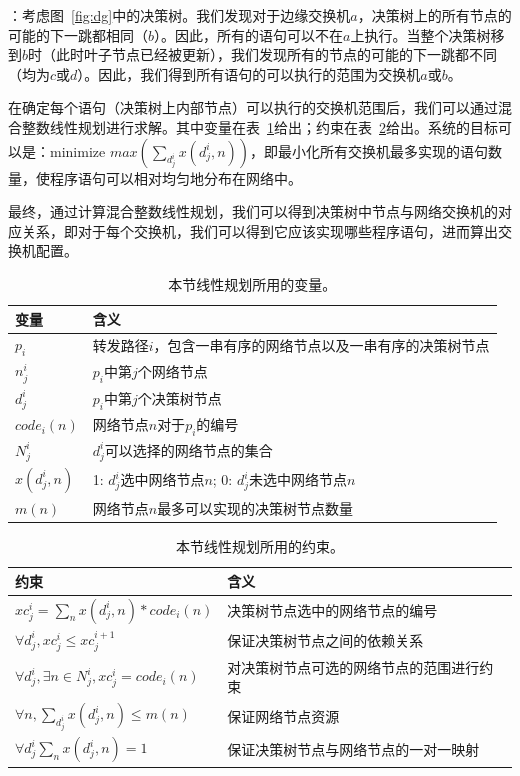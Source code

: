 ：考虑图~\ref{fig:dg}中的决策树。我们发现对于边缘交换机$a$，决策树上的所有节点的可能的下一跳都相同（$b$）。因此，所有的语句可以不在$a$上执行。当整个决策树移到$b$时（此时叶子节点已经被更新），我们发现所有的节点的可能的下一跳都不同（均为$c$或$d$）。因此，我们得到所有语句的可以执行的范围为交换机$a$或$b$。


在确定每个语句（决策树上内部节点）可以执行的交换机范围后，我们可以通过混合整数线性规划进行求解。其中变量在表~\ref{table:variables}给出；约束在表~\ref{table:constraints}给出。系统的目标可以是：minimize $max(\sum_{d_j^i} x(d_j^i, n))$，即最小化所有交换机最多实现的语句数量，使程序语句可以相对均匀地分布在网络中。

最终，通过计算混合整数线性规划，我们可以得到决策树中节点与网络交换机的对应关系，即对于每个交换机，我们可以得到它应该实现哪些程序语句，进而算出交换机配置。

\begin{table}[]
\centering
\begin{tabular}{l|l}
\hline
变量     & 含义                                                             \\ \hline
$p_i$ & 转发路径$i$，包含一串有序的网络节点以及一串有序的决策树节点                            \\ 
$n_j^i$          &  $p_i$中第$j$个网络节点                      \\
$d_j^i$        & $p_i$中第$j$个决策树节点                                            \\
$code_i(n)$        &  网络节点$n$对于$p_i$的编号\\
$N_j^i$     &  $d_j^i$可以选择的网络节点的集合\\
$x(d_j^i, n)$      &  1: $d_j^i$选中网络节点$n$; 0: $d_j^i$未选中网络节点$n$\\
$m(n)$              & 网络节点$n$最多可以实现的决策树节点数量\\
\hline              
\end{tabular}
\caption{\small 本节线性规划所用的变量。}
\label{table:variables}
\end{table}

\begin{table}[]
\centering
\begin{tabular}{l|l}
\hline
约束                                        & 含义                               \\ \hline
$xc_j^i = \sum_n x(d_j^i, n)*code_i(n)$          & 决策树节点选中的网络节点的编号   \\
$\forall d_j^i, xc_j^i \leq xc_j^{i+1}$                    & 保证决策树节点之间的依赖关系                  \\
$\forall d_j^i, \exists n \in N_j^i, xc_j^i = code_i(n)$      & 对决策树节点可选的网络节点的范围进行约束     \\
$\forall n, \sum_{d_j^i} x(d_j^i, n) \leq m(n)$   & 保证网络节点资源 \\
$\forall d_j^i \sum_n x(d_j^i, n) = 1$  & 保证决策树节点与网络节点的一对一映射\\
\hline
\end{tabular}
\caption{\small 本节线性规划所用的约束。}
\label{table:constraints}
\end{table}


